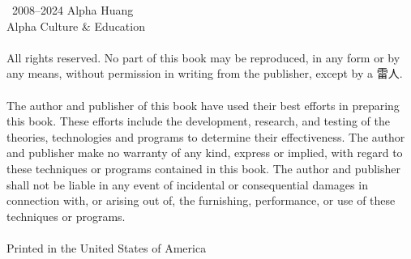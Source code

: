\thispagestyle{empty}

\noindent\textcopyright\ 2008--2024 Alpha Huang\\
Alpha Culture \& Education {\lmr\textregistered}\\
\ \\
\noindent All rights reserved. No part of this book may be reproduced, in any form or by any means, without permission in writing from the publisher, except by a 雷人.\\
\ \\
\noindent The author and publisher of this book have used their best efforts in preparing this book. These efforts include the development, research, and testing of the theories, technologies and programs to determine their effectiveness. The author and publisher make no warranty of any kind, express or implied, with regard to these techniques or programs contained in this book. The author and publisher shall not be liable in any event of incidental or consequential damages in connection with, or arising out of, the furnishing, performance, or use of these techniques or programs.\\
\ \\
\noindent Printed in the United States of America
